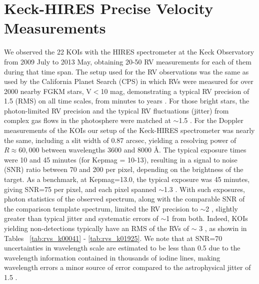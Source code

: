 \documentclass{emulateapj}
\begin{document}
\section{Keck-HIRES Precise Velocity Measurements}
\label{sec:preciseRVs}
  We observed the 22 KOIs with the HIRES spectrometer at the Keck
 Observatory from 2009 July to 2013 May, obtaining 20-50 RV
 measurements for each of them during that time span.  The setup used
 for the RV observations was the same as used by the California Planet
 Search (CPS) \citep{Marcy_Butler92, Marcy08} in which RVs were
 measured for over 2000 nearby FGKM stars, V$<$10 mag, demonstrating a
 typical RV precision of 1.5 \ms (RMS) on all time scales, from
 minutes to years \citep{Howard2010b}.  For those bright stars, the
 photon-limited RV precision and the typical RV fluctuations (jitter)
 from complex gas flows in the photosphere were matched at $\sim$1.5
 \ms.  For the Doppler measurements of the KOIs our setup of the
 Keck-HIRES spectrometer was nearly the same, including a slit width of
 0.87 arcsec, yielding a resolving power of $R \approx 60,000$ between
 wavelengths 3600 and 8000 \AA. The typical exposure times were 10 and
 45 minutes (for Kepmag = 10-13), resulting in a signal to noise (SNR)
 ratio between 70 and 200 per pixel, depending on the brightness of
 the target.  As a benchmark, at Kepmag=13.0, the typical exposure was
 45 minutes, giving SNR=75 per pixel, and each pixel spanned $\sim$1.3
 \kms.  With such exposures, photon statistics of the observed
 spectrum, along with the comparable SNR of the comparison template
 spectrum, limited the RV precision to $\sim$2 \ms, slightly greater
 than typical jitter and systematic errors of $\sim$1 \ms from both.
  Indeed, KOIs yielding non-detections typically have an RMS of the RVs
 of $\sim$ 3 \ms, as showin in Tables ~\ref{tab:rvs_k00041} - \ref{tab:rvs_k01925}.  
 We note that at SNR=70 uncertainties in wavelength scale are estimated to be less than 0.5
 \ms due to the wavelength information contained in thousands of
 iodine lines, making wavelength errors a minor source of
 error compared to the astrophysical jitter of 1.5 \ms.
\end{document}

